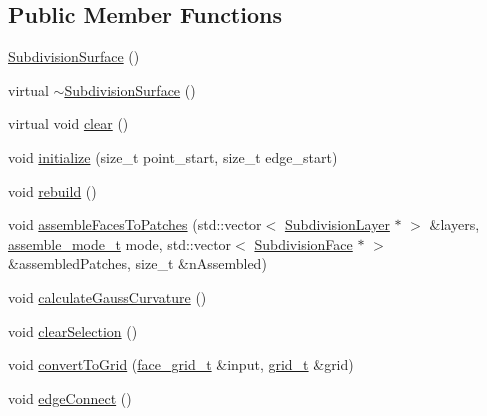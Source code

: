 \subsection*{Public Member Functions}
\begin{DoxyCompactItemize}
\item 
\hyperlink{classShipCADGeometry_1_1SubdivisionSurface_a507ea9cd5354e1d14fe24d52da505934}{Subdivision\-Surface} ()
\item 
virtual \hyperlink{classShipCADGeometry_1_1SubdivisionSurface_a4f1b66a4d9e9f8ac3dbd956e2113a594}{$\sim$\-Subdivision\-Surface} ()
\item 
virtual void \hyperlink{classShipCADGeometry_1_1SubdivisionSurface_a80ab3bd6372a8465d69f71034a353e06}{clear} ()
\item 
void \hyperlink{classShipCADGeometry_1_1SubdivisionSurface_a13cfd2714344c9b85aad8d123538db48}{initialize} (size\-\_\-t point\-\_\-start, size\-\_\-t edge\-\_\-start)
\item 
void \hyperlink{classShipCADGeometry_1_1SubdivisionSurface_a259856fc21f2bc1eebbc52f10dd59469}{rebuild} ()
\item 
void \hyperlink{classShipCADGeometry_1_1SubdivisionSurface_ad140279118fab3343a6aee5e544814ec}{assemble\-Faces\-To\-Patches} (std\-::vector$<$ \hyperlink{classShipCADGeometry_1_1SubdivisionLayer}{Subdivision\-Layer} $\ast$ $>$ \&layers, \hyperlink{classShipCADGeometry_1_1SubdivisionSurface_a43e2c7b57684c6741bfd80506a19c33e}{assemble\-\_\-mode\-\_\-t} mode, std\-::vector$<$ \hyperlink{classShipCADGeometry_1_1SubdivisionFace}{Subdivision\-Face} $\ast$ $>$ \&assembled\-Patches, size\-\_\-t \&n\-Assembled)
\item 
void \hyperlink{classShipCADGeometry_1_1SubdivisionSurface_a3aa7c4fd1fa84170a59e6c0549573c92}{calculate\-Gauss\-Curvature} ()
\item 
void \hyperlink{classShipCADGeometry_1_1SubdivisionSurface_a2a984cc9ae8c78153113552cfb6321d5}{clear\-Selection} ()
\item 
void \hyperlink{classShipCADGeometry_1_1SubdivisionSurface_a1deabf43f6a24c34a58889d0361b0959}{convert\-To\-Grid} (\hyperlink{classShipCADGeometry_1_1SubdivisionSurface_a9059895d23b9715aac304d3fecca12fb}{face\-\_\-grid\-\_\-t} \&input, \hyperlink{classShipCADGeometry_1_1SubdivisionSurface_a360ddace48a5d6827e99a21e78a6c458}{grid\-\_\-t} \&grid)
\item 
void \hyperlink{classShipCADGeometry_1_1SubdivisionSurface_aa0460120d8a093682ca352a47affdb87}{edge\-Connect} ()
\item 

\end{DoxyCompactItemize}
